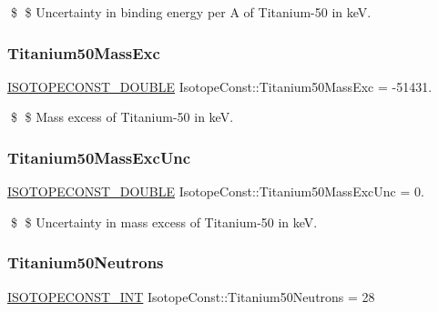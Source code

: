 \$ \$ Uncertainty in binding energy per A of Titanium-\/50 in keV. \mbox{\label{group___isotope_const-_titanium-_ti50_ga77dd3ad40b842a3dce9cd10012c12e47}} 
\subsubsection{\texorpdfstring{Titanium50\+Mass\+Exc}{Titanium50MassExc}}
{\footnotesize\ttfamily \mbox{\hyperlink{group___isotope_const-_macros_ga8f45a7272ce02c0b4c65c44636ed719a}{I\+S\+O\+T\+O\+P\+E\+C\+O\+N\+S\+T\+\_\+\+D\+O\+U\+B\+LE}} Isotope\+Const\+::\+Titanium50\+Mass\+Exc = -\/51431.}

\$ \$ Mass excess of Titanium-\/50 in keV. \mbox{\label{group___isotope_const-_titanium-_ti50_ga963701d96b0242dda1016017ae115ba2}} 
\subsubsection{\texorpdfstring{Titanium50\+Mass\+Exc\+Unc}{Titanium50MassExcUnc}}
{\footnotesize\ttfamily \mbox{\hyperlink{group___isotope_const-_macros_ga8f45a7272ce02c0b4c65c44636ed719a}{I\+S\+O\+T\+O\+P\+E\+C\+O\+N\+S\+T\+\_\+\+D\+O\+U\+B\+LE}} Isotope\+Const\+::\+Titanium50\+Mass\+Exc\+Unc = 0.}

\$ \$ Uncertainty in mass excess of Titanium-\/50 in keV. \mbox{\label{group___isotope_const-_titanium-_ti50_gaf62e2193f50c55753e1254328da65dd9}} 
\subsubsection{\texorpdfstring{Titanium50\+Neutrons}{Titanium50Neutrons}}
{\footnotesize\ttfamily \mbox{\hyperlink{group___isotope_const-_macros_ga5f18360b3e99483a35c32d789e62621c}{I\+S\+O\+T\+O\+P\+E\+C\+O\+N\+S\+T\+\_\+\+I\+NT}} Isotope\+Const\+::\+Titanium50\+Neutrons = 28}

